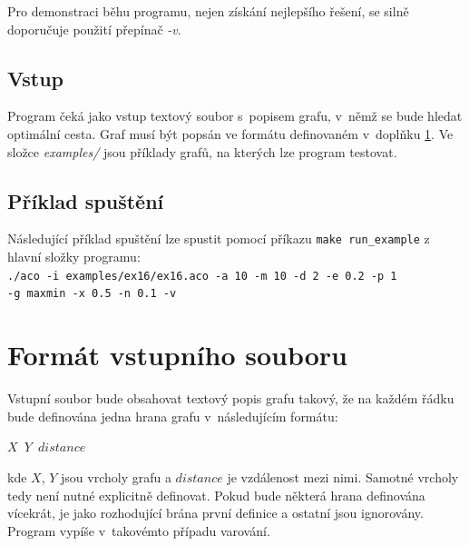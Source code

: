\documentclass[a4paper, 12pt]{article}
\begin{document}
Pro demonstraci běhu programu, nejen získání nejlepšího řešení, se silně doporučuje použití přepínač \emph{-v}.

\subsection{Vstup}
Program čeká jako vstup textový soubor s~popisem grafu, v~němž se bude hledat optimální cesta. Graf musí být popsán ve formátu definovaném 
v~doplňku \ref{app:format}. Ve složce \emph{examples/} jsou příklady grafů, na kterých lze program testovat.

\subsection{Příklad spuštění}
Následující příklad spuštění lze spustit pomocí příkazu \texttt{make run\_example} z hlavní složky programu:\\
\texttt{./aco -i examples/ex16/ex16.aco -a 10 -m 10 -d 2 -e 0.2 -p 1\\ -g maxmin -x 0.5 -n 0.1 -v}

\section{Formát vstupního souboru}
\label{app:format}
Vstupní soubor bude obsahovat textový popis grafu takový, že na každém řádku bude definována jedna hrana grafu v~následujícím formátu:
\begin{center}
  \texttt{$X$ $Y$ $distance$}
\end{center}
kde $X$, $Y$ jsou vrcholy grafu a $distance$ je vzdálenost mezi nimi. Samotné vrcholy tedy není nutné explicitně definovat. Pokud bude některá hrana
definována vícekrát, je jako rozhodující brána první definice a ostatní jsou ignorovány. Program vypíše v~takovémto případu varování.

\newpage


\end{document}
